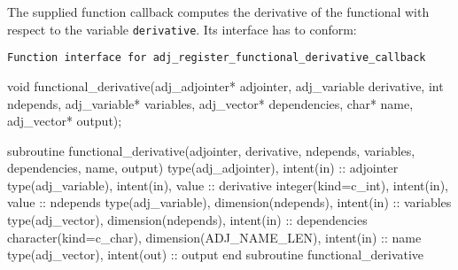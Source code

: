 The supplied function callback computes the derivative of the functional with respect to the variable \texttt{derivative}. 
Its interface has to conform:

\begin{boxwithtitle}{\texttt{Function interface for \texttt{adj_register_functional_derivative_callback}}}
\begin{minipage}{\columnwidth}
\begin{ccode}
void functional_derivative(adj_adjointer* adjointer,
                               adj_variable derivative, int ndepends, 
                               adj_variable* variables, adj_vector* dependencies,
                               char* name, adj_vector* output);
\end{ccode}
\begin{fortrancode}
subroutine functional_derivative(adjointer, derivative, ndepends, variables, 
                                 dependencies, name, output) 
  type(adj_adjointer), intent(in) :: adjointer
  type(adj_variable), intent(in), value :: derivative 
  integer(kind=c_int), intent(in), value :: ndepends
  type(adj_variable), dimension(ndepends), intent(in) :: variables
  type(adj_vector), dimension(ndepends), intent(in) :: dependencies
  character(kind=c_char), dimension(ADJ_NAME_LEN), intent(in) :: name
  type(adj_vector), intent(out) :: output
end subroutine functional_derivative
\end{fortrancode}
\end{minipage}
\end{boxwithtitle}

